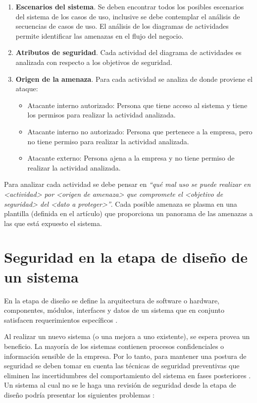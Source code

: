 \begin{enumerate}[noitemsep]
	\item \textbf{Escenarios del sistema}. Se deben encontrar todos los posibles escenarios del sistema de los casos de uso, inclusive se debe contemplar el análisis de secuencias de casos de uso. El análisis de los diagramas de actividades permite identificar las amenazas en el flujo del negocio.
	\item \textbf{Atributos de seguridad}. Cada actividad del diagrama de actividades es analizada con respecto a los objetivos de seguridad.
	\item \textbf{Origen de la amenaza}. Para cada actividad se analiza de donde proviene el ataque:
	\begin{itemize}[noitemsep]
		\item Atacante interno autorizado: Persona que tiene acceso al sistema y tiene los permisos para realizar la actividad analizada.
		\item Atacante interno no autorizado: Persona que pertenece a la empresa, pero no tiene permiso para realizar la actividad analizada.
		\item Atacante externo: Persona ajena a la empresa y no tiene permiso de realizar la actividad analizada.
	\end{itemize}
\end{enumerate} 

Para analizar cada actividad se debe pensar en \textit{``qué mal uso se puede realizar en <actividad> por <origen de amenaza> que compromete el <objetivo de seguridad> del <dato a proteger>''}. Cada posible amenaza se plasma en una plantilla (definida en el artículo) que proporciona un panorama de las amenazas a las que está expuesto el sistema. 

\section{Seguridad en la etapa de diseño de un sistema}\label{sec:segDiseño}

En la etapa de diseño se define la arquitectura de software o hardware, componentes, módulos, interfaces y datos de un sistema que en conjunto satisfacen requerimientos específicos \cite{Weik2001}. %

\vspace{0.3cm}

Al realizar un nuevo sistema (o una mejora a uno existente), se espera provea un beneficio. La mayoría de los sistemas contienen procesos confidenciales o información sensible de la empresa. Por lo tanto, para mantener una postura de seguridad se deben tomar en cuenta las técnicas de seguridad preventivas que eliminen las incertidumbres del comportamiento del sistema en fases posteriores \cite{BazLim07}. Un sistema al cual no se le haga una revisión de seguridad desde la etapa de diseño podría presentar los siguientes problemas \cite{BazLim07}:

